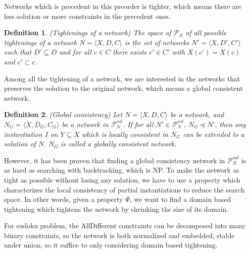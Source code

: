 \documentclass[a4paper, 12pt]{report}
\newtheorem{definition}{Definition}[subsection]
\begin{document}
            Networks which is precedent in this preorder is tighter, which means there are less solution or more constraints in the precedent ones.

            \begin{definition}
                (Tightenings of a network\cite{rossi2006handbook}) The space of $\mathcal P_N$ of all possible tightenings of a network $N=\langle X,D,C\rangle$ is the set of networks $N'=\langle X,D',C'\rangle$ such that $D'\subseteq D$ and for all $c\in C$ there exists $c'\in C'$ with $X(c')=X(c)$ and $c'\subset c$.
            \end{definition}

            Among all the tightening of a network, we are interested in the networks that preserves the solution to the original network, which means a global consistent network.

            \begin{definition}
                (Global consistency\cite{rossi2006handbook}) Let $N=\langle X,D,C\rangle$ be a network, and $N_G=\langle X,D_G,C_G\rangle$ be a network in $\mathcal P^{sol}_N$. If for all $N'\in \mathcal P^{sol}_N$, $N_G\preceq N'$, then any instantiation $I$ on $Y\subseteq X$ which is locally consistent in $N_G$ can be extended to a solution of $N$. $N_G$ is called a globally consistent network.
            \end{definition}

            However, it has been proven that finding a global consistency network in $\mathcal P^{sol}_N$ is as hard as searching with backtracking, which is NP. To make the network as tight as possible without losing any solution, we have to use a property which characterizes the local consistency of partial instantiations to reduce the search space. In other words, given a property $\Phi$, we want to find a domain based tightening which tightens the network by
            shrinking the size of its domain.

            For sudoku problem, the AllDifferent constraints can be decomposed into many binary constraints, so the network is both normalized and embedded, stable under union, so it suffice to only considering domain based tightening.
\end{document}

